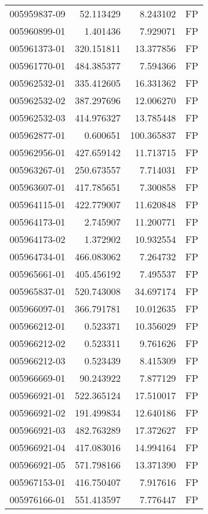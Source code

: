 \begin{tabular}{lrrl}
005959837-09 &   52.113429 &     8.243102 &   FP \\
005960899-01 &    1.401436 &     7.929071 &   FP \\
005961373-01 &  320.151811 &    13.377856 &   FP \\
005961770-01 &  484.385377 &     7.594366 &   FP \\
005962532-01 &  335.412605 &    16.331362 &   FP \\
005962532-02 &  387.297696 &    12.006270 &   FP \\
005962532-03 &  414.976327 &    13.785448 &   FP \\
005962877-01 &    0.600651 &   100.365837 &   FP \\
005962956-01 &  427.659142 &    11.713715 &   FP \\
005963267-01 &  250.673557 &     7.714031 &   FP \\
005963607-01 &  417.785651 &     7.300858 &   FP \\
005964115-01 &  422.779007 &    11.620848 &   FP \\
005964173-01 &    2.745907 &    11.200771 &   FP \\
005964173-02 &    1.372902 &    10.932554 &   FP \\
005964734-01 &  466.083062 &     7.264732 &   FP \\
005965661-01 &  405.456192 &     7.495537 &   FP \\
005965837-01 &  520.743008 &    34.697174 &   FP \\
005966097-01 &  366.791781 &    10.012635 &   FP \\
005966212-01 &    0.523371 &    10.356029 &   FP \\
005966212-02 &    0.523311 &     9.761626 &   FP \\
005966212-03 &    0.523439 &     8.415309 &   FP \\
005966669-01 &   90.243922 &     7.877129 &   FP \\
005966921-01 &  522.365124 &    17.510017 &   FP \\
005966921-02 &  191.499834 &    12.640186 &   FP \\
005966921-03 &  482.763289 &    17.372627 &   FP \\
005966921-04 &  417.083016 &    14.994164 &   FP \\
005966921-05 &  571.798166 &    13.371390 &   FP \\
005967153-01 &  416.750407 &     7.917616 &   FP \\
005976166-01 &  551.413597 &     7.776447 &   FP \\

\end{tabular}
